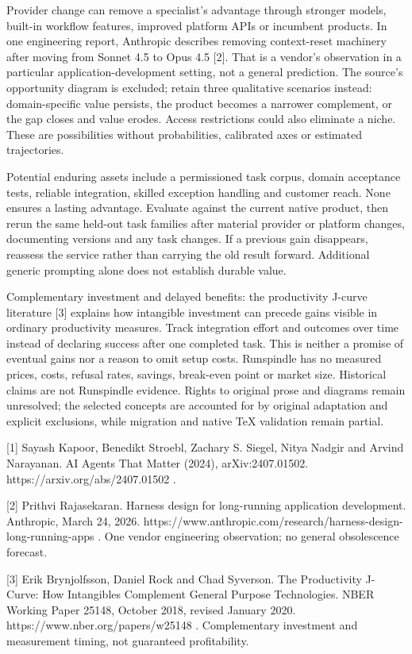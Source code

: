 \documentclass[11pt,letterpaper]{article}
\begin{document}
Provider change can remove a specialist's advantage through stronger models, built-in workflow features, improved platform APIs or incumbent products. In one engineering report, Anthropic describes removing context-reset machinery after moving from Sonnet 4.5 to Opus 4.5 [2]. That is a vendor's observation in a particular application-development setting, not a general prediction. The source's opportunity diagram is excluded; retain three qualitative scenarios instead: domain-specific value persists, the product becomes a narrower complement, or the gap closes and value erodes. Access restrictions could also eliminate a niche. These are possibilities without probabilities, calibrated axes or estimated trajectories.

Potential enduring assets include a permissioned task corpus, domain acceptance tests, reliable integration, skilled exception handling and customer reach. None ensures a lasting advantage. Evaluate against the current native product, then rerun the same held-out task families after material provider or platform changes, documenting versions and any task changes. If a previous gain disappears, reassess the service rather than carrying the old result forward. Additional generic prompting alone does not establish durable value.

Complementary investment and delayed benefits: the productivity J-curve literature [3] explains how intangible investment can precede gains visible in ordinary productivity measures. Track integration effort and outcomes over time instead of declaring success after one completed task. This is neither a promise of eventual gains nor a reason to omit setup costs. Runspindle has no measured prices, costs, refusal rates, savings, break-even point or market size. Historical claims are not Runspindle evidence. Rights to original prose and diagrams remain unresolved; the selected concepts are accounted for by original adaptation and explicit exclusions, while migration and native TeX validation remain partial.

[1] Sayash Kapoor, Benedikt Stroebl, Zachary S. Siegel, Nitya Nadgir and Arvind Narayanan. AI Agents That Matter (2024), arXiv:2407.01502. https://arxiv.org/abs/2407.01502 .

[2] Prithvi Rajasekaran. Harness design for long-running application development. Anthropic, March 24, 2026. https://www.anthropic.com/research/harness-design-long-running-apps . One vendor engineering observation; no general obsolescence forecast.

[3] Erik Brynjolfsson, Daniel Rock and Chad Syverson. The Productivity J-Curve: How Intangibles Complement General Purpose Technologies. NBER Working Paper 25148, October 2018, revised January 2020. https://www.nber.org/papers/w25148 . Complementary investment and measurement timing, not guaranteed profitability.
\end{document}
